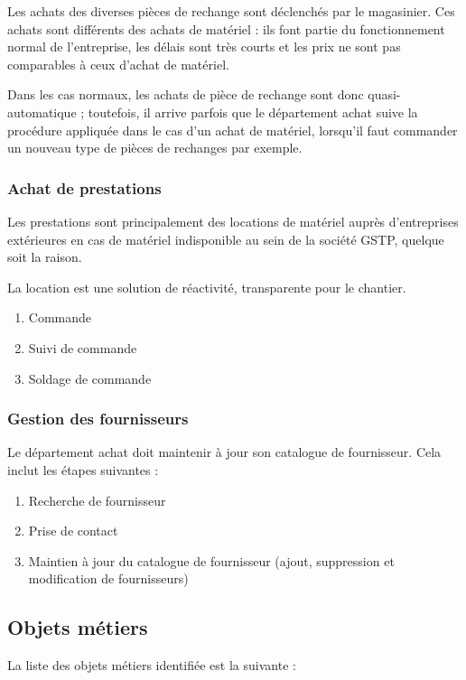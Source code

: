 Les achats des diverses pièces de rechange sont déclenchés
par le magasinier.
Ces achats sont différents des achats de matériel : ils font partie du
fonctionnement normal de l'entreprise, les délais sont très courts et les
prix ne sont pas comparables à ceux d'achat de matériel.

Dans les cas normaux, les achats de pièce de rechange sont donc
quasi-automatique ; toutefois, il arrive parfois que le département achat
suive la procédure appliquée dans le cas d'un achat de matériel, lorsqu'il
faut commander un nouveau type de pièces de rechanges par exemple.


\subsubsection{Achat de prestations}

Les prestations sont principalement des locations de matériel auprès
d'entreprises extérieures en cas de matériel indisponible au sein de la
société GSTP, quelque soit la raison.

La location est une solution de réactivité, transparente pour le chantier.

\begin{enumerate}
\item Commande 
\item Suivi de commande
\item Soldage de commande
\end{enumerate}


\subsubsection{Gestion des fournisseurs}

Le département achat doit maintenir à jour son catalogue de fournisseur.
Cela inclut les étapes suivantes :
\begin{enumerate}
\item Recherche de fournisseur
\item Prise de contact
\item Maintien à jour du catalogue de fournisseur (ajout, suppression et
        modification de fournisseurs)
\end{enumerate}


\subsection{Objets métiers}

La liste des objets métiers identifiée est la suivante :

